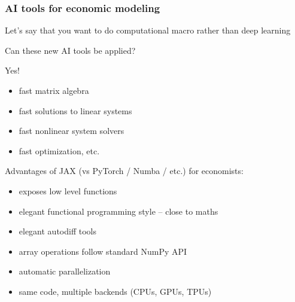 \documentclass[
    xcolor={svgnames,dvipsnames},
    hyperref={colorlinks, citecolor=DeepPink4, linkcolor=DarkRed, urlcolor=DarkBlue}
    ]{beamer}  %
\newcommand{\1}{\mathbbm 1}
\begin{document}
\begin{frame}
    \frametitle{AI tools for economic modeling}


    Let's say that you want to do computational macro rather than deep learning

    \vspace{0.5em}
    Can these new AI tools be applied?

    \pause

    \vspace{0.5em}
    \vspace{0.5em}
    Yes!

    \begin{itemize}
        \item fast matrix algebra
        \vspace{0.5em}
        \item fast solutions to linear systems
        \vspace{0.5em}
        \item fast nonlinear system solvers
        \vspace{0.5em}
        \item fast optimization, etc.
    \end{itemize}


\end{frame}


\begin{frame}

    Advantages of JAX (vs PyTorch / Numba / etc.) for economists:
    \begin{itemize}
        \item exposes low level functions
            \vspace{0.5em}
        \item elegant functional programming style -- close to maths
            \vspace{0.5em}
        \item elegant autodiff tools
            \vspace{0.5em}
        \item array operations follow standard NumPy API
            \vspace{0.5em}
        \item automatic parallelization
            \vspace{0.5em}
        \item same code, multiple backends (CPUs, GPUs, TPUs)
    \end{itemize}

\end{frame}
\end{document}
